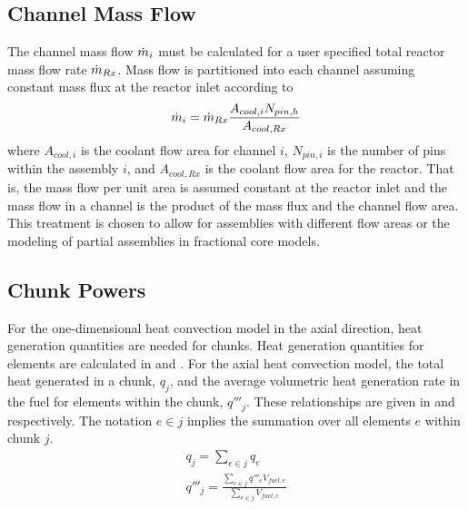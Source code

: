   \subsection{Channel Mass Flow}
    The channel mass flow $\dot{m}_i$ must be calculated for a user 
    specified total reactor mass flow rate $\dot{m}_{Rx}$.  Mass flow is 
    partitioned into each channel assuming constant mass flux at the reactor 
    inlet according to 
    \begin{equation}
      \label{eq:mass_flow_split}
      \dot{m}_i = \dot{m}_{Rx} \frac{A_{cool,i}N_{pin,h}}{A_{cool,Rx}}
    \end{equation}
    where $A_{cool,i}$ is the coolant flow area for channel $i$, $N_{pin,i}$ is
    the number of pins within the assembly $i$, and $A_{cool,Rx}$
    is the coolant flow area for the reactor.  That is, the mass 
    flow per unit area is assumed constant at the reactor inlet and the mass
    flow in a channel is the product of the mass flux and the channel flow area.
    This treatment is chosen to allow for assemblies with different flow areas
    or the modeling of partial assemblies in fractional core models.

  \subsection{Chunk Powers}
    For the one-dimensional heat convection model in the axial direction,
    heat generation quantities are needed for chunks. Heat generation quantities
    for elements are calculated in  and
    .
    For the axial heat convection model, the total heat generated in a chunk,
    $q_j$, and the average volumetric heat generation rate in the fuel for
    elements within the chunk, $q'''_j$. 
    These relationships are given in  and
     respectively. The notation $e \in j$ implies the
    summation over all elements $e$ within chunk $j$.
    \begin{align}
      \label{eq:chunkpwr}
      q_j = \sum_{e \in j} q_e \\
      \label{eq:chunkqppp_fuel}
      q'''_j = \frac{\sum_{e \in j} q'''_e V_{fuel,e}}{\sum_{e \in j} V_{fuel,e}}
    \end{align}
  
